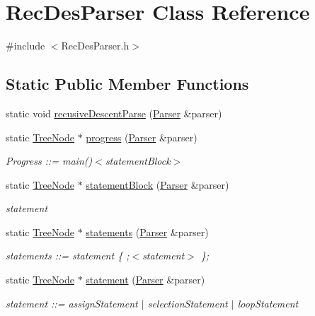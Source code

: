 \hypertarget{class_rec_des_parser}{}\section{Rec\+Des\+Parser Class Reference}
\label{class_rec_des_parser}


{\ttfamily \#include $<$Rec\+Des\+Parser.\+h$>$}

\subsection*{Static Public Member Functions}
\begin{DoxyCompactItemize}
\item 
static void \hyperlink{class_rec_des_parser_a68ff046dddb08a9cb19326c0ef619cf5}{recusive\+Descent\+Parse} (\hyperlink{class_parser}{Parser} \&parser)
\item 
static \hyperlink{class_tree_node}{Tree\+Node} $\ast$ \hyperlink{class_rec_des_parser_ae636ed876dccbbbf0df947162017ee95}{progress} (\hyperlink{class_parser}{Parser} \&parser)
\begin{DoxyCompactList}\small\item\em Progress \+:\+:= main()$<$statement\+Block$>$ \end{DoxyCompactList}\item 
static \hyperlink{class_tree_node}{Tree\+Node} $\ast$ \hyperlink{class_rec_des_parser_a80e51116fe42f872f43c351dba1b50eb}{statement\+Block} (\hyperlink{class_parser}{Parser} \&parser)
\begin{DoxyCompactList}\small\item\em statement \end{DoxyCompactList}\item 
\hypertarget{class_rec_des_parser_a2e8faf92b1c011395f75898af8b23390}{}\label{class_rec_des_parser_a2e8faf92b1c011395f75898af8b23390} 
static \hyperlink{class_tree_node}{Tree\+Node} $\ast$ \hyperlink{class_rec_des_parser_a2e8faf92b1c011395f75898af8b23390}{statements} (\hyperlink{class_parser}{Parser} \&parser)
\begin{DoxyCompactList}\small\item\em statements \+:\+:= statement \{ ;$<$statement$>$ \}; \end{DoxyCompactList}\item 
static \hyperlink{class_tree_node}{Tree\+Node} $\ast$ \hyperlink{class_rec_des_parser_a4a1fdc2b0e31b91a9e834ad60b396b37}{statement} (\hyperlink{class_parser}{Parser} \&parser)
\begin{DoxyCompactList}\small\item\em statement \+:\+:= assign\+Statement $\vert$ selection\+Statement $\vert$ loop\+Statement \end{DoxyCompactList}\item 

\end{DoxyCompactItemize}

